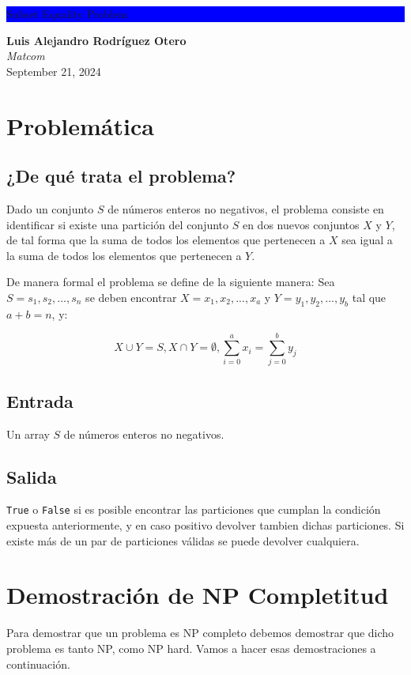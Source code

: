 \documentclass[11pt]{article}
\begin{document}
    \begin{titlepage}
        \centering
        \colorbox{blue}{\parbox{\textwidth}{\centering\color{white}\Huge Subset Equality Problem}}
        \vfill
        \Large
        \textbf{Luis Alejandro Rodríguez Otero} \\
        \textit{Matcom} \\
        September 21, 2024
        \vfill
    \end{titlepage}

    \newpage

    \tableofcontents
    \newpage

    \section{Problemática}
    \subsection{¿De qué trata el problema?}
    Dado un conjunto $S$ de números enteros no negativos, el problema consiste en identificar si existe una
    partición del conjunto $S$ en dos nuevos conjuntos $X$ y $Y$, de tal forma que la suma de todos los elementos
    que pertenecen a $X$ sea igual a la suma de todos los elementos que pertenecen a $Y$.

    De manera formal el problema se define de la siguiente manera: Sea $S = {s_1, s_2, ... ,s_n}$ se deben
    encontrar $X = x_1, x_2, ... , x_a$ y $Y = y_1, y_2, ... ,y_b$ tal que $a+b=n$, y:

    \[
    X \cup Y = S, X \cap Y= \emptyset, \sum_{i=0}^{a} x_i = \sum_{j=0}^b y_j
    \]
    
    \subsection{Entrada}
    Un array $S$ de números enteros no negativos.
    
    \subsection{Salida}
    \texttt{True} o \texttt{False} si es posible encontrar las particiones que cumplan la condición expuesta anteriormente, y en
    caso positivo devolver tambien dichas particiones. Si existe más de un par de particiones válidas se puede 
    devolver cualquiera.

    \section{Demostración de NP Completitud}
    Para demostrar que un problema es NP completo debemos demostrar que dicho problema es tanto NP, como NP hard.
    Vamos a hacer esas demostraciones a continuación.
\end{document}

